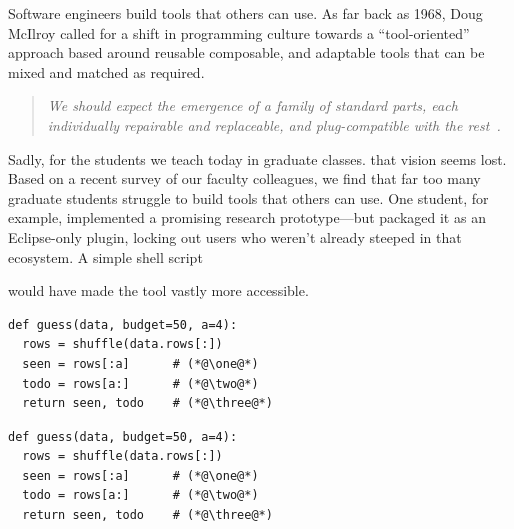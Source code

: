 \documentclass[AMA,STIX2COL]{WileyNJDv5}
\newif\ifcircledred
\newcommand{\circledblack}{\global\circledredfalse}
\newcommand{\circledtoggle}{%
  \ifcircledred
    \global\circledredfalse
  \else
    \global\circledredtrue
  \fi
}
\DeclareRobustCommand*\circled[1]{%
  \setlength{\fboxsep}{1.2pt}%
  \ifcircledred
    \fcolorbox{Maroon}{Maroon}{\color{white}\tiny\bfseries #1}%
  \else
    \fcolorbox{black}{black}{\color{white}\tiny\bfseries #1}%
  \fi
}
\DeclareRobustCommand{\one}{\circled{1}}
\begin{document}
 







\noindent
Software engineers build tools that others can use. As far back as 1968, Doug McIlroy called for a shift in programming culture towards a ``tool-oriented'' approach based around   reusable  composable, and adaptable tools that can be mixed and matched as required.

\begin{quote} 
{\em We should expect the emergence of a family of standard parts, each individually repairable and 
replaceable, and plug-compatible with the rest~\cite{mcilroy1968mass}.} 
\end{quote}
 

Sadly, for the students we teach today in graduate classes.  that vision seems lost.
Based on a recent survey of our faculty colleagues, we find that far too many graduate students struggle to build tools that others can use. One student, for example, implemented a promising research prototype—but packaged it as an Eclipse-only plugin, locking out users who weren't already steeped in that ecosystem. A simple shell script {\one} would have made the tool vastly more accessible.
\circledblack
\begin{lstlisting}
def guess(data, budget=50, a=4):
  rows = shuffle(data.rows[:])
  seen = rows[:a]      # (*@\one@*) 
  todo = rows[a:]      # (*@\two@*)
  return seen, todo    # (*@\three@*)
\end{lstlisting} 
\circledtoggle
\begin{lstlisting}
def guess(data, budget=50, a=4): 
  rows = shuffle(data.rows[:])
  seen = rows[:a]      # (*@\one@*) 
  todo = rows[a:]      # (*@\two@*)
  return seen, todo    # (*@\three@*)
\end{lstlisting} 
\end{document}
